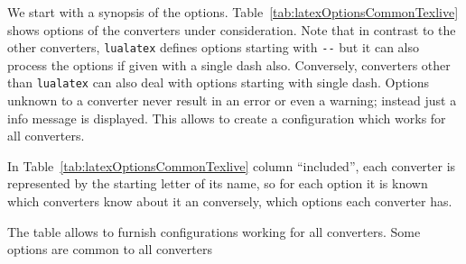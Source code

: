 \documentclass{article}
\newcommand{\lualatex}{\texttt{lualatex}}
\begin{document}
We start with a synopsis of the options. 
Table~\ref{tab:latexOptionsCommonTexlive} 
shows options of the converters under consideration. 
Note that in contrast to the other converters, 
\lualatex{} defines options starting with \texttt{-{}-} 
but it can also process the options if given with a single dash also. 
Conversely, converters other than \lualatex{} can also deal with options 
starting with single dash. 
Options unknown to a converter never result in an error or even a warning; 
instead just a info message is displayed. 
This allows to create a configuration which works for all converters. 

In Table~\ref{tab:latexOptionsCommonTexlive} column ``included'', 
each converter is represented by the starting letter of its name, 
so for each option it is known which converters know about it 
an conversely, which options each converter has. 

The table allows to furnish configurations working for all converters. 
Some options are common to all converters
\end{document}
